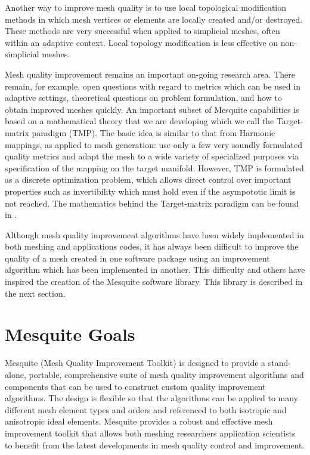 Another way to improve mesh quality is to use local topological modification methods in which mesh vertices or elements are locally created and/or destroyed. These methods are very successful when applied to simplicial meshes, often within an adaptive context.  Local topology modification is less effective on non-simplicial meshes. \newline

Mesh quality improvement remains an important on-going research area.
There remain, for example, open questions with regard to metrics which
can be used in adaptive settings, theoretical questions on problem
formulation, and how to obtain improved meshes quickly. An important
subset of Mesquite capabilities is based on a mathematical theory that we
are developing which we call the Target-matrix paradigm (TMP).  The
basic idea is similar to that from Harmonic mappings, as applied to mesh
generation: use only a few very soundly formulated quality metrics and
adapt the mesh to a wide variety of specialized purposes via specification
of the mapping on the target manifold. However, TMP is formulated as a
discrete optimization problem, which allows direct control over important
properties such as invertibility which must hold even if the asympototic limit
is not reached. The mathematics behind the Target-matrix
paradigm can be found in \cite{formal,local2dmetrics,convexity,analysis2D,labelinv,labelinv-imr,tgtcons}. \newline

Although mesh quality improvement algorithms have been widely implemented
in both meshing and applications codes, it has always been difficult to
improve the quality of a mesh created in one software package using an
improvement algorithm which has been implemented in another.  This difficulty
and others have inspired the creation of the Mesquite software library.
This library is described in the next section. \newline


\section{Mesquite Goals}
Mesquite (Mesh Quality Improvement Toolkit) is designed to provide a
stand-alone, portable, comprehensive suite of mesh quality improvement
algorithms and components that can be used to construct custom quality
improvement algorithms.
The design is flexible so that the algorithms can be applied to many
different mesh element types and orders and referenced to both
isotropic and anisotropic ideal elements.  Mesquite provides a robust
and effective mesh improvement toolkit that allows both meshing
researchers application scientists to benefit from the latest
developments in mesh quality control and improvement. \newline

